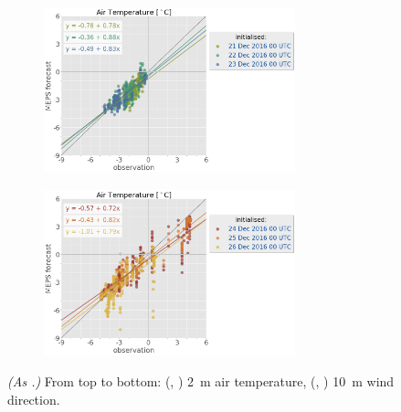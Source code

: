 \begin{figure}
	\begin{subfigure}[b]{0.49\textwidth}
		\centering
		\includegraphics[trim={25.cm 15.5cm 0cm 3.6cm},clip,
		width=0.8\textwidth]{./fig_sfc_temp/obs_model_20161221_23_00_label}
	\end{subfigure}
	\begin{subfigure}[b]{0.49\textwidth}
		\centering
		\includegraphics[trim={25.cm 15.5cm 0cm 3.6cm},clip,
		width=0.8\textwidth]{./fig_sfc_temp/obs_model_20161224_26_00_label}
	\end{subfigure}
	\caption{\textit{(As .)} From top to bottom: (\protect{}, \protect{}) \SI{2}{\metre} air temperature, (\protect{}, \protect{}) \SI{10}{\metre} wind direction.} \label{fig:scat:T_WD}
\end{figure}
